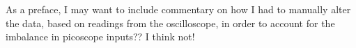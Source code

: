 \documentclass[12pt]{article}
\begin{document}
As a preface, I may want to include commentary on how I had to manually alter the data, based on readings from the oscilloscope, in order to account for the imbalance in picoscope inputs?? I think not!






\end{document}
